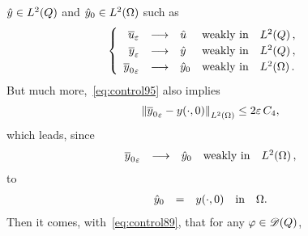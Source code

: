 $\hat{y}\in L^{2}\!\left({Q}\right)$ and ${\hat{y}}_{0}\in L^{2}\!\left({\Omega}\right)$ such as
\begin{equation*}
    \begin{cases}\displaystyle
        \begin{array}{rclll}
            {\overline{u}}_{\varepsilon} & \longrightarrow & \hat{u} & \text{weakly in} &
            L^{2}\!\left({Q}\right),\\
            {\overline{y}}_{\varepsilon} & \longrightarrow & \hat{y} & \text{weakly in} &
            L^{2}\!\left({Q}\right),\\
            {\overline{y}_{0}}_{\varepsilon} & \longrightarrow & {\hat{y}}_{0} &
            \text{weakly in} & L^{2}\!\left({\Omega}\right).
        \end{array}
    \end{cases}
\end{equation*}
But much more,~\eqref{eq:control95} also implies
\begin{equation}\label{eq:control106}
    {\left\|{{\overline{y}_{0}}_{\varepsilon} -  {y}\!\left({\cdot, 0}\right)  }\right\|}_{L^{2}\left({\Omega}\right)} \leq 2\varepsilon\,C_{4},
\end{equation}
which leads, since
\begin{equation}\label{eq:control106p}
    \begin{array}{rclll}
        {\overline{y}_{0}}_{\varepsilon} & \longrightarrow & {\hat{y}}_{0} &
        \text{weakly in} & L^{2}\!\left({\Omega}\right),
    \end{array}
\end{equation}
to
\begin{equation}\label{eq:control107}
    \begin{array}{rclll}
        {\hat{y}}_{0} & = & {y}\!\left({\cdot, 0}\right) & \text{in} & \Omega.
    \end{array}
\end{equation}
Then it comes, with~\eqref{eq:control89}, that for any $\varphi\in\mathscr{D}(Q)$,
